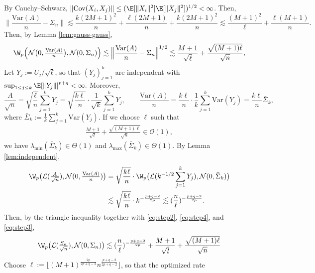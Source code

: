 \documentclass[mnsc,nonblindrev]{informs3}
\begin{document}
By Cauchy--Schwarz, $\|\mathrm{Cov}(X_i,X_j)\|\le (\E[\|X_i\|^2]\E[\|X_j\|^2])^{1/2}<\infty$. Then,
\begin{equation*}
\Big\|\frac{\mathrm{Var}(A)}{n}-\Sigma_n\Big\|
\lesssim \frac{k(2M+1)^2}{n}+ \frac{\ell(2M+1)}{n}+\frac{k(2M+1)^2}{n}\lesssim \frac{(M+1)^2}{\ell} + \frac{\ell(M+1)}{n}.
\end{equation*}
Then, by Lemma \ref{lem:gauss-gauss},
\begin{equation}\label{eq:step4}
\W_p\Big(\mathcal{N}\big(0,\tfrac{\mathrm{Var}(A)}{n}\big),\mathcal{N}(0,\Sigma_n)\Big)
\lesssim  \Big\|\frac{\mathrm{Var}(A)}{n}-\Sigma_n\Big\|^{1/2}\lesssim \frac{M+1}{\sqrt{\ell}} + \frac{\sqrt{(M+1)\ell}}{\sqrt{n}},
\end{equation}
Let $Y_j:=U_j/\sqrt{\ell}$, so that $(Y_j)_{j=1}^k$ are independent with $\sup_{1\le j\le k}\E[\|Y_j\|]^{p+q}<\infty.$ Moreover,
\[
\frac{A}{\sqrt{n}}=\sqrt{\frac{\ell}{n}}\sum_{j=1}^k Y_j
=\sqrt{\frac{k\ell}{n}}\cdot \frac{1}{\sqrt{k}}\sum_{j=1}^k Y_j,
\qquad
\frac{\mathrm{Var}(A)}{n}=\frac{k\ell}{n}\cdot \frac{1}{k}\sum_{j=1}^k\mathrm{Var}(Y_j)
=\frac{k\ell}{n} \bar\Sigma_k,
\]
where $\bar\Sigma_k:=\frac{1}{k}\sum_{j=1}^k\mathrm{Var}(Y_j)$. If we choose $\ell$ such that 
\begin{align*}
\frac{M+1}{\sqrt{\ell}} + \frac{\sqrt{(M+1)\ell}}{\sqrt{n}} \in \mathcal{O}(1),
\end{align*}
we have $\lambda_{\min}(\bar\Sigma_k) \in \Theta(1)$ and $\lambda_{\max}(\bar\Sigma_k) \in \Theta(1)$. 
By Lemma \ref{lem:independent},
\begin{equation}\label{eq:step3}
\begin{aligned}
\W_p\big(\mathcal{L}(\tfrac{A}{\sqrt{n}}),\mathcal{N}(0,\tfrac{\mathrm{Var}(A)}{n})\big)
&= \sqrt{\frac{k\ell}{n}} \cdot  \W_p\big(\mathcal{L}(k^{-1/2}\sum_{j=1}^k Y_j),\mathcal{N}(0,\bar\Sigma_k)\big)\\
&\lesssim \sqrt{\frac{k\ell}{n}} \cdot k^{-\frac{p+q-2}{2p}} \lesssim (\frac{n}{\ell})^{-\frac{p+q-2}{2p}} .
\end{aligned}
\end{equation}
 Then, by the triangle inequality together with \eqref{eq:step2}, \eqref{eq:step4}, and \eqref{eq:step3},
\begin{equation}\label{eq:master}
\W_p\big(\mathcal{L}(\tfrac{S_n}{\sqrt{n}}),\mathcal{N}(0,\Sigma_n)\big)
\lesssim (\frac{n}{\ell})^{-\frac{p+q-2}{2p}} + \frac{M+1}{\sqrt{l}} + \frac{\sqrt{(M+1)\ell}}{\sqrt{n}}
\end{equation}
Choose $\ell:=\lfloor (M+1)^{\frac{2 p}{2 p+q-2}} n^{\frac{p+q-2}{2 p+q-2}}\rfloor$, so that the optimized rate
\end{document}

